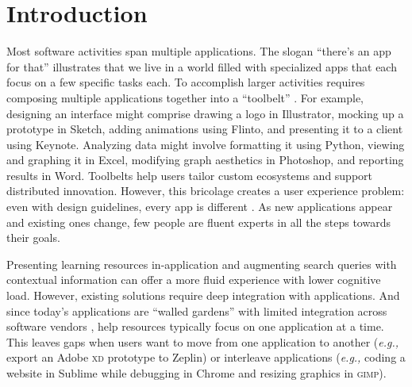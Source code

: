 \section{Introduction}
Most software activities span multiple applications. The slogan ``there's an app for that'' illustrates that we live in a world filled with specialized apps that each focus on a few specific tasks each. To accomplish larger activities requires composing multiple applications together into a ``toolbelt'' \cite{Sumner1997}. For example, designing an interface might comprise drawing a logo in Illustrator, mocking up a prototype in Sketch, adding animations using Flinto, and presenting it to a client using Keynote. Analyzing data might involve formatting it using Python, viewing and graphing it in Excel, modifying graph aesthetics in Photoshop, and reporting results in Word. Toolbelts help users tailor custom ecosystems and support distributed innovation. However, this bricolage creates a user experience problem: even with design guidelines, every app is different \cite{Beaudouin-Lafon2018}. As new applications appear and existing ones change, few people are fluent experts in all the steps towards their goals.

Presenting learning resources in-application \cite{Grossman2010a, Chilana2012, Matejka2011a, Matejka2011, Brandt2010, Ichinco2017} and augmenting search queries with contextual information \cite{Ekstrand2011, Brandt2010} can offer a more fluid experience with lower cognitive load. However, existing solutions require deep integration with applications. And since today's applications are ``walled gardens''  with limited integration across software vendors \cite{Beaudouin-Lafon2018}, help resources typically focus on one application at a time. This leaves gaps when users want to move from one application to another (\textit{e.g.,} export an Adobe \textsc{xd} prototype to Zeplin) or interleave applications (\textit{e.g.,} coding a website in Sublime while debugging in Chrome and resizing graphics in \textsc{gimp}). 



